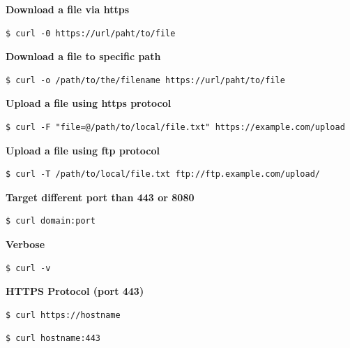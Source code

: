 \documentclass{article}
\newenvironment{codetemplate}[1][]{%
  \mybasecolorbox[#1]
  \itshape
}{%
  \endmybasecolorbox
}
\begin{document}
\textbf{Download a file via https}
\begin{codetemplate}{}
\begin{verbatim}
$ curl -0 https://url/paht/to/file
\end{verbatim}
\end{codetemplate}

\textbf{Download a file to specific path}
\begin{codetemplate}{}
\begin{verbatim}
$ curl -o /path/to/the/filename https://url/paht/to/file
\end{verbatim}
\end{codetemplate}

\textbf{Upload a file using https protocol}
\begin{codetemplate}{}
\begin{verbatim}
$ curl -F "file=@/path/to/local/file.txt" https://example.com/upload
\end{verbatim}
\end{codetemplate}

\textbf{Upload a file using ftp protocol}
\begin{codetemplate}{}
\begin{verbatim}
$ curl -T /path/to/local/file.txt ftp://ftp.example.com/upload/
\end{verbatim}
\end{codetemplate}

\textbf{Target different port than 443 or 8080}
\begin{codetemplate}{}
\begin{verbatim}
$ curl domain:port
\end{verbatim}
\end{codetemplate}

\textbf{Verbose}
\begin{codetemplate}{}
\begin{verbatim}
$ curl -v 
\end{verbatim}
\end{codetemplate}

\textbf{HTTPS Protocol (port 443)}
\begin{codetemplate}{}
\begin{verbatim}
$ curl https://hostname
\end{verbatim}
\end{codetemplate}
\begin{codetemplate}{}
\begin{verbatim}
$ curl hostname:443
\end{verbatim}
\end{codetemplate}
\end{document}
